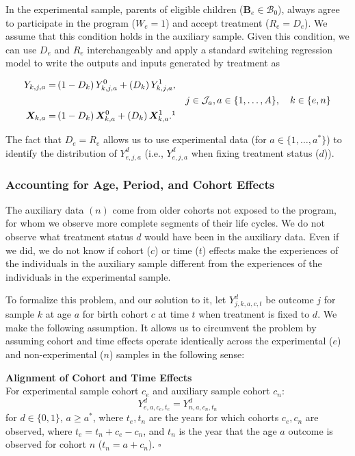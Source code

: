 In the experimental sample, parents of eligible children ($\bm{B}_e \in \mathcal{B}_{0}$), always agree to participate in the program ($W_e = 1$) and accept treatment ($R_e = D_e$). We assume that this condition holds in the auxiliary sample. Given this condition, we can use $D_e$ and $R_e$ interchangeably and apply a standard \citet{Quandt_1972_JASA} switching regression model to write the outputs and inputs generated by treatment as
\begin{spacing}{1}
\begin{align}\label{eq:countersystem}
Y_{k,j,a} =& \left( 1 - D_k \right) Y_{k,j,a}^0 + \left( D_k \right) Y_{k,j,a}^1, \\
&&j \in \mathcal{J}_a, a \in \{1,\dots,A\}, \quad k \in \{e,n\} \nonumber \\
\bm{X}_{k,a} =& \left( 1 - D_k \right) \bm{X}_{k,a}^0 + \left( D_k \right) \bm{X}_{k,a}^1.\nonumber\footnotemark
\end{align}
\end{spacing}
\noindent The fact that $D_e = R_e$ allows us to use experimental data (for $a \in \{1, \dots,a^*\}$) to identify the distribution of $Y_{e,j,a}^d$ (i.e., $Y_{e,j,a}^d$ when fixing treatment status ($d$)).

\subsubsection{Accounting for Age, Period, and Cohort Effects}
\label{sec:accoutning-age-period-cohort}
The auxiliary data $(n)$ come from older cohorts not exposed to the program, for whom we observe more complete segments of their life cycles. We do not observe what treatment status $d$ would have been in the auxiliary data. Even if we did, we do not know if cohort ($c$) or time ($t$) effects make the experiences of the individuals in the auxiliary sample different from the experiences of the individuals in the experimental sample.

To formalize this problem, and our solution to it, let $Y_{j,k,a,c,t}^d$ be outcome $j$ for sample $k$ at age $a$ for birth cohort $c$ at time $t$ when treatment is fixed to $d$. We make the following assumption. It allows us to circumvent the problem by assuming cohort and time effects operate identically across the experimental ($e$) and non-experimental ($n$) samples in the following sense:

\onehalfspacing
\begin{assumption}\label{ass:alignment} \textbf{Alignment of Cohort and Time Effects}\\
For experimental sample cohort $c_{e}$ and auxiliary sample cohort $c_{n}$:
\begin{equation}
Y_{e,a,c_{e},t_{e}}^d = Y_{n,a,c_{n},t_{n}}^d
\end{equation}
for $d \in \{ 0, 1\}$, $a \geq a^*$, where $t_{e}, t_{n}$ are the years for which cohorts $c_{e}, c_{n}$ are observed, where $t_e = t_n + c_e - c_n$, and $t_n$ is the year that the age $a$ outcome is observed for cohort $n$ ($t_n = a + c_n$). $\square$
\end{assumption}
\doublespacing

